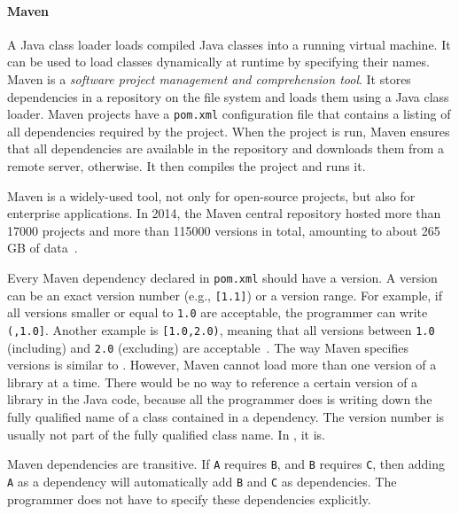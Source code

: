 \paragraph{Maven}
A Java class loader loads compiled Java classes into a running virtual machine. It can be used to load classes dynamically at runtime by specifying their names. Maven is a \emph{software project management and comprehension tool}. It stores dependencies in a repository on the file system and loads them using a Java class loader. Maven projects have a \texttt{pom.xml} configuration file that contains a listing of all dependencies required by the project. When the project is run, Maven ensures that all dependencies are available in the repository and downloads them from a remote server, otherwise. It then compiles the project and runs it.

Maven is a widely-used tool, not only for open-source projects, but also for enterprise applications. In 2014, the Maven central repository hosted more than 17000 projects and more than 115000 versions in total, amounting to about 265 GB of data~\cite{Mitropoulos:2014:BCM:2597073.2597123}.

Every Maven dependency declared in \texttt{pom.xml} should have a version. A version can be an exact version number (e.g., \texttt{[1.1]}) or a version range. For example, if all versions smaller or equal to \texttt{1.0} are acceptable, the programmer can write \texttt{(,1.0]}. Another example is \texttt{[1.0,2.0)}, meaning that all versions between \texttt{1.0} (including) and \texttt{2.0} (excluding) are acceptable~\cite{books/daglib/0021697}. The way Maven specifies versions is similar to \msname. However, Maven cannot load more than one version of a library at a time. There would be no way to reference a certain version of a library in the Java code, because all the programmer does is writing down the fully qualified name of a class contained in a dependency. The version number is usually not part of the fully qualified class name. In \msname, it is.

Maven dependencies are transitive. If \texttt{A} requires \texttt{B}, and \texttt{B} requires \texttt{C}, then adding \texttt{A} as a dependency will automatically add \texttt{B} and \texttt{C} as dependencies. The programmer does not have to specify these dependencies explicitly.

